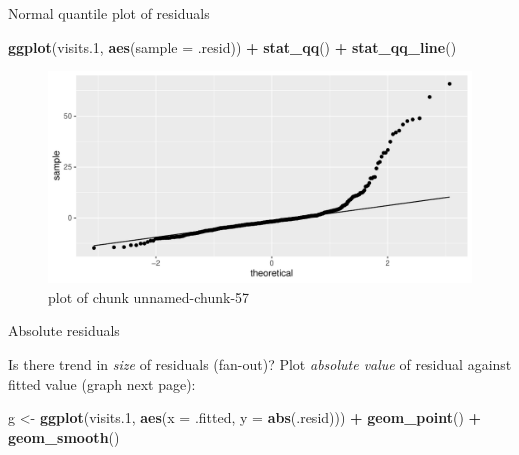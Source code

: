 \documentclass[ignorenonframetext,]{beamer}
\newenvironment{Shaded}{\begin{snugshade}}{\end{snugshade}}
\newcommand{\DataTypeTok}[1]{\textcolor[rgb]{0.13,0.29,0.53}{#1}}
\newcommand{\FloatTok}[1]{\textcolor[rgb]{0.00,0.00,0.81}{#1}}
\newcommand{\KeywordTok}[1]{\textcolor[rgb]{0.13,0.29,0.53}{\textbf{#1}}}
\newcommand{\NormalTok}[1]{#1}
\newcommand{\OperatorTok}[1]{\textcolor[rgb]{0.81,0.36,0.00}{\textbf{#1}}}
\newcommand{\StringTok}[1]{\textcolor[rgb]{0.31,0.60,0.02}{#1}}
\begin{document}
\begin{frame}[fragile]{Normal quantile plot of residuals}
\protect\hypertarget{normal-quantile-plot-of-residuals}{}

\begin{Shaded}
\begin{Highlighting}[]
\KeywordTok{ggplot}\NormalTok{(visits}\FloatTok{.1}\NormalTok{, }\KeywordTok{aes}\NormalTok{(}\DataTypeTok{sample =}\NormalTok{ .resid)) }\OperatorTok{+}\StringTok{ }\KeywordTok{stat_qq}\NormalTok{() }\OperatorTok{+}\StringTok{ }\KeywordTok{stat_qq_line}\NormalTok{()}
\end{Highlighting}
\end{Shaded}

\begin{figure}
\centering
\includegraphics{figure/unnamed-chunk-57-1.pdf}
\caption{plot of chunk unnamed-chunk-57}
\end{figure}

\end{frame}

\begin{frame}[fragile]{Absolute residuals}
\protect\hypertarget{absolute-residuals}{}

Is there trend in \emph{size} of residuals (fan-out)? Plot
\emph{absolute value} of residual against fitted value (graph next
page):

\begin{Shaded}
\begin{Highlighting}[]
\NormalTok{g <-}\StringTok{ }\KeywordTok{ggplot}\NormalTok{(visits}\FloatTok{.1}\NormalTok{, }\KeywordTok{aes}\NormalTok{(}\DataTypeTok{x =}\NormalTok{ .fitted, }\DataTypeTok{y =} \KeywordTok{abs}\NormalTok{(.resid))) }\OperatorTok{+}
\StringTok{  }\KeywordTok{geom_point}\NormalTok{() }\OperatorTok{+}\StringTok{ }\KeywordTok{geom_smooth}\NormalTok{()}
\end{Highlighting}
\end{Shaded}

\end{frame}
\end{document}
